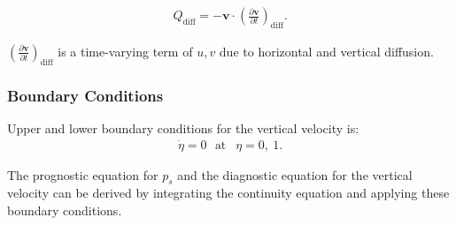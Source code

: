 \begin{eqnarray}
Q_{\mathrm{diff}}
= - {\mathbf{v}} \cdot  \left( \frac{\partial {\mathbf{v}}}{\partial t} \right)_{\mathrm{diff}} .
\end{eqnarray}

\(( \frac{\partial {\mathbf{v}}}{\partial t} )_{\mathrm{diff}}\) is a time-varying term of \(u,v\) due to horizontal and vertical diffusion.

\hypertarget{boundary-conditions}{%
\subsubsection{Boundary Conditions}\label{boundary-conditions}}

Upper and lower boundary conditions for the vertical velocity is: \begin{eqnarray}
\dot{\eta} = 0  \ \ \ \text{at~} \ \ \eta = 0 , \ 1 .
\end{eqnarray}

The prognostic equation for \(p_s\) and the diagnostic equation for the vertical velocity can be derived by integrating the continuity equation and applying these boundary conditions.

